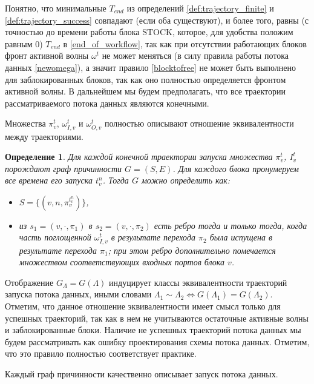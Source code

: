 \documentclass[10pt,a4paper]{article}
\newtheorem{defen}{Определение}
\newcommand{\stock}{\text{STOCK}}
\begin{document}
  Понятно, что минимальные $T_{end}$ из определений \ref{def:trajectory_finite} и \ref{def:trajectory_success} совпадают (если оба существуют), и более того, равны
  (с точностью до времени работы блока $\stock$, которое, для удобства положим равным $0$) $T_{end}$ в \eqref{end_of_workflow}, так как при отсутствии работающих
  блоков фронт активной волны $\omega^t$ не может меняться (в силу правила работы потока данных \eqref{newomega}),
  а значит правило \eqref{blocktofree} не может быть выполнено для заблокированных блоков, так как оно полностью определяется фронтом активной волны.
  В дальнейшем мы будем предполагать, что все траектории рассматриваемого потока данных являются конечными.
  
  Множества $\pi^t_v$, $\omega^t_{I, v}$ и $\omega^t_{O, v}$ полностью описывают отношение эквивалентности между траекториями.
  \begin{defen}
    Для каждой конечной траектории запуска множества $\pi^t_v$, $I^t_v$ порождают граф причинности $G = (S, E)$.
    Для каждого блока пронумеруем все времена его запуска $t^n_v$. Тогда $G$ можно определить как:
    \begin{itemize}
      \item $S = \{ (v, n, \pi^{t^n_v}_v) \}$,\\
      \item из $s_1 = (v, \cdot, \pi_1)$ в $s_2 = (v, \cdot, \pi_2)$ есть ребро тогда и только тогда,
      когда часть поглощенной $\omega^t_{I, v}$ в результате перехода $\pi_2$ была испущена в результате перехода $\pi_1$;
      при этом ребро дополнительно помечается множеством соответствующих входных портов блока $v$.
    \end{itemize}
  \end{defen}
  
  Отображение $G_{\Lambda} = G(\Lambda)$ индуцирует классы эквивалентности траекторий запуска потока данных,
  иными словами $\Lambda_1 \sim \Lambda_2 \Leftrightarrow G(\Lambda_1) = G(\Lambda_2)$.
  Отметим, что данное отношение эквивалентности имеет смысл только для успешных траекторий, так как в нем не учитываются остаточные активные волны и заблокированные блоки.
  Наличие не успешных траекторий потока данных мы будем рассматривать как ошибку проектирования схемы потока данных. Отметим, что это правило полностью соответствует практике.
  
  Каждый граф причинности качественно описывает запуск потока данных.
  
\end{document}
